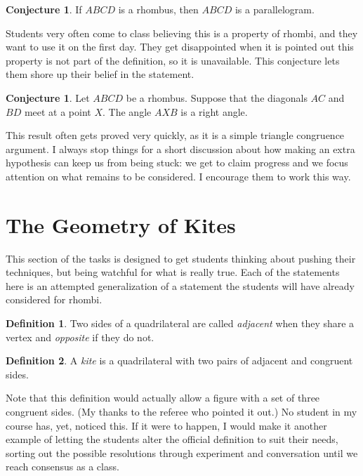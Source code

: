 \documentclass{tufte-handout}
\theoremstyle{definition}
\newtheorem{conjecture}[problem]{Conjecture}
\newtheorem*{definition}{Definition}
\begin{document}
\begin{conjecture}
\label{conj:rhombus-is-parallelogram}
If $ABCD$ is a rhombus, then $ABCD$ is a parallelogram.
\end{conjecture}

Students very often come to class believing this is a property of rhombi, and they want to use it on the first day.
They get disappointed when it is pointed out this property is not part of the definition, so it is unavailable.
This conjecture lets them shore up their belief in the statement.

\begin{conjecture}
\label{conj:rhombus-diagonals-angle}
Let $ABCD$ be a rhombus. Suppose that the diagonals $AC$ and $BD$ meet at a point $X$.
The angle $AXB$ is a right angle.
\end{conjecture}

This result often gets proved very quickly, as it is a simple triangle congruence argument. I always stop things for a short discussion about how making an extra hypothesis can keep us from being stuck: we get to claim progress and we focus attention on what remains to be considered. I encourage them to work this way.

\clearpage
\setcounter{section}{2}
\setcounter{problem}{0}
\section{The Geometry of Kites}

This section of the tasks is designed to get students thinking about pushing their techniques, but being watchful for what is really true. Each of the statements here is an attempted generalization of a statement the students will have already considered for rhombi. 

\begin{definition}\label{defn:quad-sides-type}
Two sides of a quadrilateral are called \emph{adjacent} when they share a vertex and \emph{opposite} if they do not.
\end{definition}

\begin{definition}\label{defn:kite}
A \emph{kite} is a quadrilateral with two pairs of adjacent and congruent sides.
\end{definition}

Note that this definition would actually allow a figure with a set of three congruent sides. (My thanks to the referee who pointed it out.) No student in my course has, yet, noticed this. If it were to happen, I would make it another example of letting the students alter the official definition to suit their needs, sorting out the possible resolutions through experiment and conversation until we reach consensus as a class.
\end{document}
